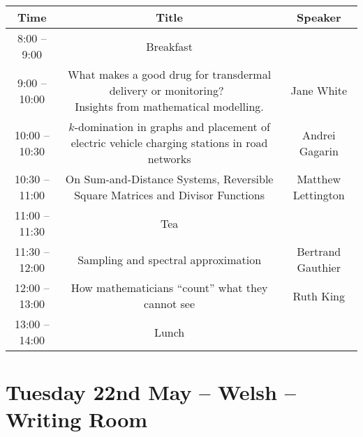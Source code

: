 \documentclass{article}
\begin{document}
\begin{center}
  \centering
  \begin{tabular}{c | c | c}
   \toprule
   \textbf{Time} & \textbf{Title} & \textbf{Speaker} \\
   \midrule
    8:00 -- 9:00 & \cellcolor{blue!25}Breakfast & \\
   \midrule
    9:00 -- 10:00 & \makecell{What makes a good drug for transdermal delivery or monitoring? \\Insights from mathematical modelling.} & Jane White \\
   \midrule
    10:00 -- 10:30 & \makecell{ $k$-domination in graphs and placement of electric vehicle \\ charging stations in road networks}  & Andrei Gagarin \\
   \midrule
    10:30 -- 11:00 & On Sum-and-Distance Systems,  Reversible Square Matrices and Divisor Functions & \makecell{Matthew \\Lettington} \\
   \midrule
    11:00 -- 11:30 & \cellcolor{blue!25}Tea &  \\
   \midrule
    11:30 -- 12:00 & Sampling and spectral approximation & Bertrand Gauthier \\
   \midrule
   12:00 -- 13:00 & {How mathematicians ``count'' what they cannot see} & Ruth King \\
   \midrule
    13:00 -- 14:00 & \cellcolor{blue!25}Lunch & \\
    \bottomrule
  \end{tabular}
\end{center}

\section*{Tuesday 22nd May -- Welsh -- Writing Room}
\end{document}
